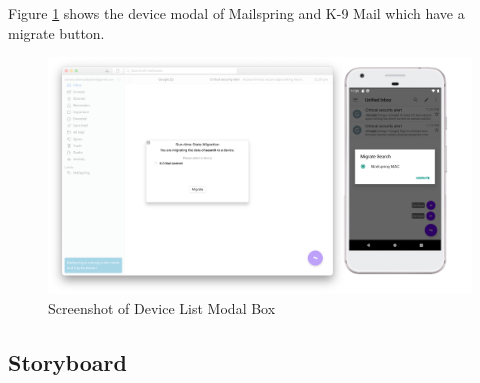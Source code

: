 Figure \ref{fig:adapt-modal} shows the device modal of Mailspring and K-9 Mail which have a migrate button.

\FloatBarrier
\begin{figure}[H]
    \includegraphics[width=\linewidth]{../figures/adapt-modal.png}
    \centering
    \caption{Screenshot of Device List Modal Box}
    \label{fig:adapt-modal}
\end{figure}
\FloatBarrier


\subsection{Storyboard}

